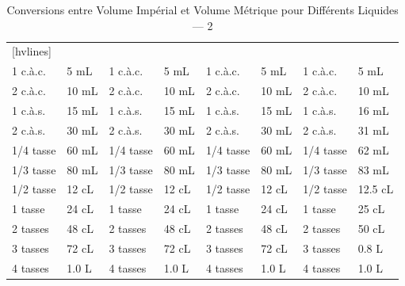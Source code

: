 \begin{table}
	\centering
	\caption{Conversions entre Volume Impérial et Volume Métrique pour Différents Liquides --- 2}
	\def\arraystretch{2}
	\begin{NiceTabular}{*{8}{m{.1\textwidth}}}[hvlines]
		 &       &  &       &  &       &            \\
		1 c.à.c.                             & 5 mL  & 1 c.à.c.                             & 5 mL  & 1 c.à.c.                                 & 5 mL  & 1 c.à.c.                                    & 5 mL    \\
		2 c.à.c.                             & 10 mL & 2 c.à.c.                             & 10 mL & 2 c.à.c.                                 & 10 mL & 2 c.à.c.                                    & 10 mL   \\
		1 c.à.s.                             & 15 mL & 1 c.à.s.                             & 15 mL & 1 c.à.s.                                 & 15 mL & 1 c.à.s.                                    & 16 mL   \\
		2 c.à.s.                             & 30 mL & 2 c.à.s.                             & 30 mL & 2 c.à.s.                                 & 30 mL & 2 c.à.s.                                    & 31 mL   \\
		1/4 tasse                            & 60 mL & 1/4 tasse                            & 60 mL & 1/4 tasse                                & 60 mL & 1/4 tasse                                   & 62 mL   \\
		1/3 tasse                            & 80 mL & 1/3 tasse                            & 80 mL & 1/3 tasse                                & 80 mL & 1/3 tasse                                   & 83 mL   \\
		1/2 tasse                            & 12 cL & 1/2 tasse                            & 12 cL & 1/2 tasse                                & 12 cL & 1/2 tasse                                   & 12.5 cL \\
		1 tasse                              & 24 cL & 1 tasse                              & 24 cL & 1 tasse                                  & 24 cL & 1 tasse                                     & 25 cL   \\
		2 tasses                             & 48 cL & 2 tasses                             & 48 cL & 2 tasses                                 & 48 cL & 2 tasses                                    & 50 cL   \\
		3 tasses                             & 72 cL & 3 tasses                             & 72 cL & 3 tasses                                 & 72 cL & 3 tasses                                    & 0.8 L   \\
		4 tasses                             & 1.0 L & 4 tasses                             & 1.0 L & 4 tasses                                 & 1.0 L & 4 tasses                                    & 1.0 L   \\
	\end{NiceTabular}
\end{table}
